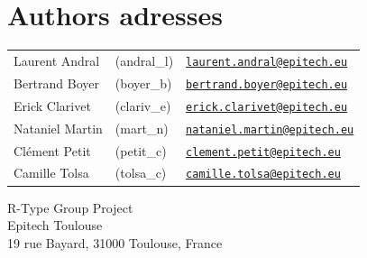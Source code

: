 \documentclass[a4 paper, 12pt]{report}
\newcommand{\email}[1]{\href{mailto:#1}{\nolinkurl{#1}}}
\begin{document}
\chapter{Authors adresses}

\begin{flushleft}
\begin{tabular}{lll}
  Laurent Andral & (andral\_l) & \email{laurent.andral@epitech.eu}\\
  Bertrand Boyer & (boyer\_b) & \email{bertrand.boyer@epitech.eu}\\
  Erick Clarivet & (clariv\_e) & \email{erick.clarivet@epitech.eu}\\
  Nataniel Martin & (mart\_n) & \email{nataniel.martin@epitech.eu}\\
  Clément Petit & (petit\_c) & \email{clement.petit@epitech.eu}\\
  Camille Tolsa & (tolsa\_c) & \email{camille.tolsa@epitech.eu}\\
\end{tabular}

\vspace{0.7cm}

R-Type Group Project\\
Epitech Toulouse\\
19 rue Bayard, 31000 Toulouse, France\\

\end{flushleft}
\end{document}
